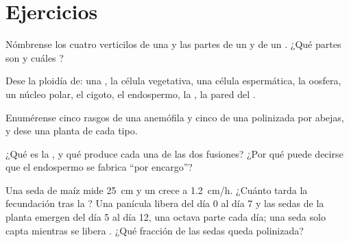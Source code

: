 \section{Ejercicios}

\begin{exercise}[$\star$]\label{exo:b2:angiosperm-reproduction:1}
Nómbrense los cuatro verticilos de una  y las partes de un 
y de un . ¿Qué partes son   y cuáles
 ?
\end{exercise}

\begin{exercise}[$\star$]\label{exo:b2:angiosperm-reproduction:2}
Dese la ploidía de: una , la célula vegetativa, una célula
espermática, la oosfera, un núcleo polar, el cigoto, el endospermo, la
, la pared del .
\end{exercise}

\begin{exercise}[$\star$]\label{exo:b2:angiosperm-reproduction:3}
Enumérense cinco rasgos de una  anemófila y cinco de una 
polinizada por abejas, y dese una planta de cada tipo.
\end{exercise}

\begin{exercise}[$\star$]\label{exo:b2:angiosperm-reproduction:4}
¿Qué es la , y qué produce cada una de las dos
fusiones? ¿Por qué puede decirse que el endospermo se fabrica ``por
encargo''?
\end{exercise}

\begin{exercise}[$\star\star$]\label{exo:b2:angiosperm-reproduction:5}
Una seda de maíz mide \qty{25}{cm} y un  crece a
\qty{1.2}{cm/h}. ¿Cuánto tarda la fecundación tras la ? Una
panícula libera  del día 0 al día 7 y las sedas de la planta
emergen del día 5 al día 12, una octava parte cada día; una seda solo
capta  mientras se libera . ¿Qué fracción de las sedas queda
polinizada?
\end{exercise}

